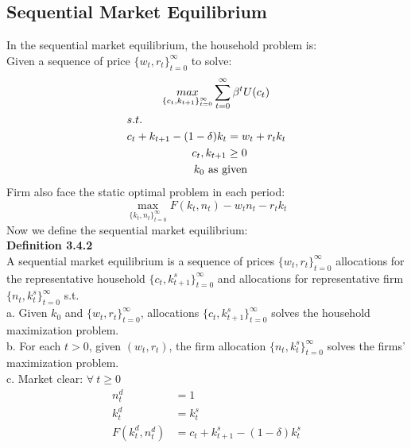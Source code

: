 \documentclass{article}
\begin{document}
\subsection{Sequential Market Equilibrium} 
In the sequential market equilibrium, the household problem is:\\
\indent Given a sequence of price $\{w_t, r_t\}^\infty_{t=0}$ to solve:
\begin{align*}
	&\indent\indent \mathop{max}\limits_{\{c_t, k_{t+1}\}^\infty_{t=0}} \sum\limits^\infty_{t=0} \beta^t U(c_t)\\
	&s.t.\\
	& c_t + k_{t+1} - (1 - \delta)k_t = w_t + r_t k_t\\
	&\indent\indent\indent\ \ \ \  c_t, k_{t+1} \geq 0\\
	&\indent\indent\indent\indent k_0\ \text{as given}
\end{align*}
Firm also face the static optimal problem in each period:
\begin{equation*}
	\mathop{max}\limits_{\{k_t, n_t\}^\infty_{t=0}} F(k_t, n_t) - w_t n_t - r_t k_t
\end{equation*}
Now we define the sequential market equilibrium:\\
\textbf{Definition 3.4.2}\\
A sequential market equilibrium is a sequence of prices $\{w_t, r_t\}^\infty_{t=0}$ allocations for the representative household $\{c_t, k^s_{t+1}\}^\infty_{t=0}$
and allocations for representative firm $\{n_t, k^s_{t}\}^\infty_{t=0}$ s.t.\\
\indent a. Given $k_0$ and $\{w_t, r_t\}^\infty_{t=0}$, allocations $\{c_t, k^s_{t+1}\}^\infty_{t=0}$ solves the household maximization problem.\\
\indent b. For each $t > 0$, given $(w_t, r_t)$, the firm allocation $\{n_t, k^s_{t}\}^\infty_{t=0}$ solves the firms' maximization problem.\\
\indent c. Market clear: $\forall\ t \geq 0$
\begin{align*}
	n^d_t &= 1\\
	k^d_t &= k^s_t\\
	F(k^d_t, n^d_t) &= c_t + k^s_{t+1} - (1 - \delta)k^s_t
\end{align*}
\end{document}
